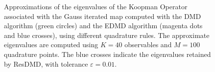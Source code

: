 \begin{figure}[h]
{    \hspace*{\fill}
}
\caption{Approximations of the eigenvalues of the Koopman Operator associated with the Gauss iterated map computed with the DMD algorithm (green circles) and the EDMD algorithm (magenta dots and blue crosses), using different quadrature rules. The approximate eigenvalues are computed using $K=40$ observables and $M = 100$ quadrature points. The blue crosses indicate the eigenvalues retained by ResDMD, with tolerance $\varepsilon = 0.01$.}
\label{fig_resdmd_quadrature_comparison}
\end{figure}

\begin{figure}[h]
\end{figure}
